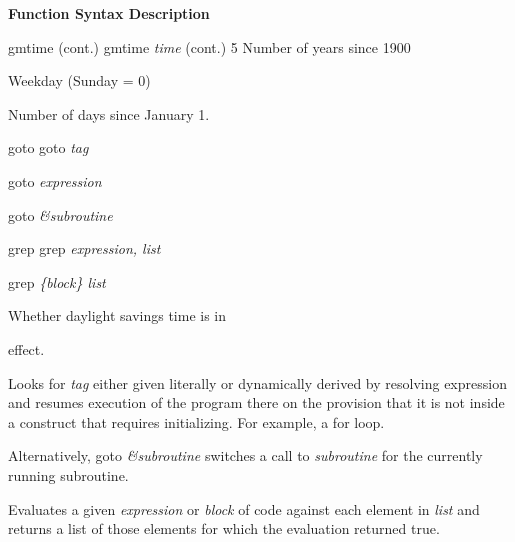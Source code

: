 \documentclass[a4paper,11pt]{book}
\begin{document}
\noindent \textbf{Function Syntax Description}

\noindent 

\noindent gmtime (cont.) gmtime \textit{time }(cont.) 5 Number of years since 1900

\noindent 

\noindent 

 Weekday (Sunday = 0)

\noindent 

\noindent 

 Number of days since January 1.

\noindent 

\noindent 

\noindent 

\noindent 

\noindent 

\noindent goto goto \textit{tag}

\noindent 

\noindent goto \textit{expression}

\noindent 

\noindent goto \textit{\&subroutine}

\noindent 

\noindent 

\noindent 

\noindent 

\noindent 

\noindent 

\noindent 

\noindent grep grep \textit{expression, list}

\noindent 

\noindent grep \textit{\{block\} list}

  Whether daylight savings time is in

\noindent effect.

\noindent 

\noindent Looks for \textit{tag }either given literally or dynamically derived by resolving expression and resumes execution of the program there on the provision that it is not inside a construct that requires initializing. For example, a for loop.

\noindent Alternatively, goto \textit{\&subroutine }switches a call to \textit{subroutine }for the currently running subroutine.

\noindent 

\noindent Evaluates a given \textit{expression }or \textit{block }of code against each element in \textit{list }and returns a list of those elements for which the evaluation returned true.
\end{document}
